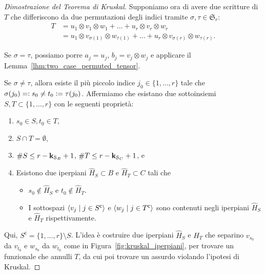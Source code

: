 \begin{proof}[Dimostrazione del Teorema di Kruskal]
	Supponiamo ora di avere due scritture di $ T $ che differiscono da due permutazioni degli indici
	tramite $ \sigma,\tau
		\in \mathfrak{S}_r $:
	\begin{equation*}
		\begin{aligned}
			T & = u_1 \otimes v_1 \otimes w_1 + \ldots + u_r \otimes v_r \otimes w_r \\
			  & =u_1 \otimes v_{\sigma(1)}
			\otimes w_{\tau(1)} + \ldots + u_r \otimes v_{\sigma(r)} \otimes w_{\tau(r)}.
		\end{aligned}
	\end{equation*}

	Se $ \sigma= \tau $, possiamo porre $a_{j} = u_j$, $b_{j} = v_{j} \otimes w_{j} $ e applicare il
	Lemma~\ref{lhm:two_case_permuted_tensor}.

	Se $ \sigma \neq \tau $, allora esiste il più piccolo indice $ j_0 \in \{1, \ldots, r\} $ tale che $
		\sigma(j_0) =\vcentcolon s_0 \neq  t_0 \vcentcolon= \tau(j_0) $. Affermiamo che esistano due sottoinsiemi $ S,T
		\subset \{1, \ldots, r\} $ con le seguenti proprietà:
	\begin{enumerate}[label=(\roman*)]
		\item $ s_0 \in S, t_0 \in T $,
		\item $ S \cap T = \emptyset $,
		\item $ \#S \le r - \mathbf{k}_{\mathcal{S}_B} + 1 $, $ \#T \le r - \mathbf{k}_{\mathcal{S}_C} + 1 $, e
		\item Esistono due iperpiani $ \hat{H}_{S} \subset B $ e $ \hat{H}_{T} \subset C $ tali che
		      \begin{itemize}
			      \item $ s_0 \not\in \hat{H}_{S}  $ e $ t_0 \not\in \hat{H}_{T} $.
			      \item I sottospazi $ \angb{v_j \mid j \in S^{\mathsf{c}}} $ e $ \angb{w_j \mid j \in
					            T^{\mathsf{c}}} $ sono contenuti negli iperpiani $ \hat{H}_{S} $ e $ \hat{H}_T $ rispettivamente.
		      \end{itemize}
	\end{enumerate}
	Qui, $ S^{\mathsf{c}} = \{1, \ldots, r\} \setminus S   $. L'idea è costruire due iperpiani
	$ \hat{H}_{S} $ e $ \hat{H}_{T} $ che separino $ v_{s_0} $ da $ v_{t_0} $ e $ w_{s_0} $ da $ w_{t_0}
	$ come in Figura~\ref{fig:kruskal_iperpiani}, per trovare un funzionale che annulli $ T $, da cui poi trovare un assurdo violando l'ipotesi di
	Kruskal.


\end{proof}
